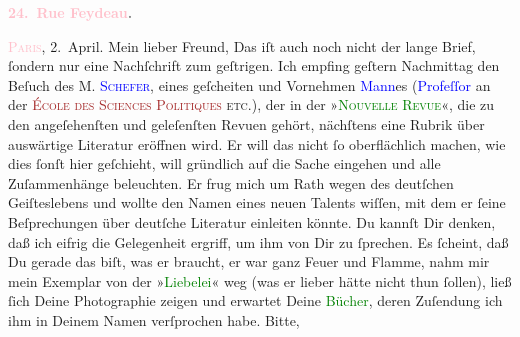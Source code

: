            \pstart
           \begin{otherlanguage}{french}\textcolor{gray}{\textbf{\textbf{\textcolor{pink}{24. Rue Feydeau}{}\ledrightnote{\textcolor{pink}{rue Feydeau}}.}}}\end{otherlanguage}\hfill \textsc{\textcolor{pink}{Paris}{}\ledrightnote{\textcolor{pink}{Paris}}}, 2. April.\pend
           \pstart\center{}Mein lieber Freund,\pend\pstart
           Das iſt auch noch nicht der lange Brief, ſondern nur eine Nachſchrift zum geſtrigen.
               Ich empfing geſtern{ }Nachmittag den Beſuch des \textsc{M. 
                  \textcolor{blue}{Schefer}{}\ledrightnote{\textcolor{blue}{Christian Schefer}}}, eines geſcheiten und Vornehmen \textcolor{blue}{Mann}{}es (\textcolor{blue}{Profeſſor}{} an der \textsc{\textcolor{brown}{École des Sciences Politiques}{}\ledrightnote{\textcolor{brown}{École libre des sciences politiques}} etc.}), der
               in der »\textsc{\textcolor{green}{Nouvelle Revue}{}\ledrightnote{\textcolor{green}{La Nouvelle Revue}}}«, die zu den angeſehenſten und geleſenſten Revuen gehört, nächſtens eine Rubrik
               über auswärtige Literatur eröffnen wird. Er will das nicht ſo oberflächlich machen,
               wie dies ſonſt hier geſchieht, will gründlich auf die Sache {\pb}eingehen und alle Zuſammenhänge beleuchten. Er frug
               mich um Rath wegen des deutſchen Geiſteslebens und wollte den Namen eines neuen
               Talents wiſſen, mit dem er ſeine Beſprechungen über deutſche Literatur einleiten
               könnte. Du kannſt Dir denken, daß ich eifrig die Gelegenheit ergriff, um ihm von Dir
               zu ſprechen. Es ſcheint, daß Du gerade das biſt, was er braucht, er war ganz Feuer
               und Flamme, nahm mir mein Exemplar von der »\textcolor{green}{Liebelei}{}\ledrightnote{\textcolor{green}{Liebelei. Schauspiel in drei Akten}}« weg (was er lieber hätte nicht thun {\pb}ſollen), ließ ſich Deine Photographie zeigen und
               erwartet Deine \textcolor{green}{Bücher}{}, deren Zuſendung ich ihm in Deinem Namen verſprochen habe. Bitte,
